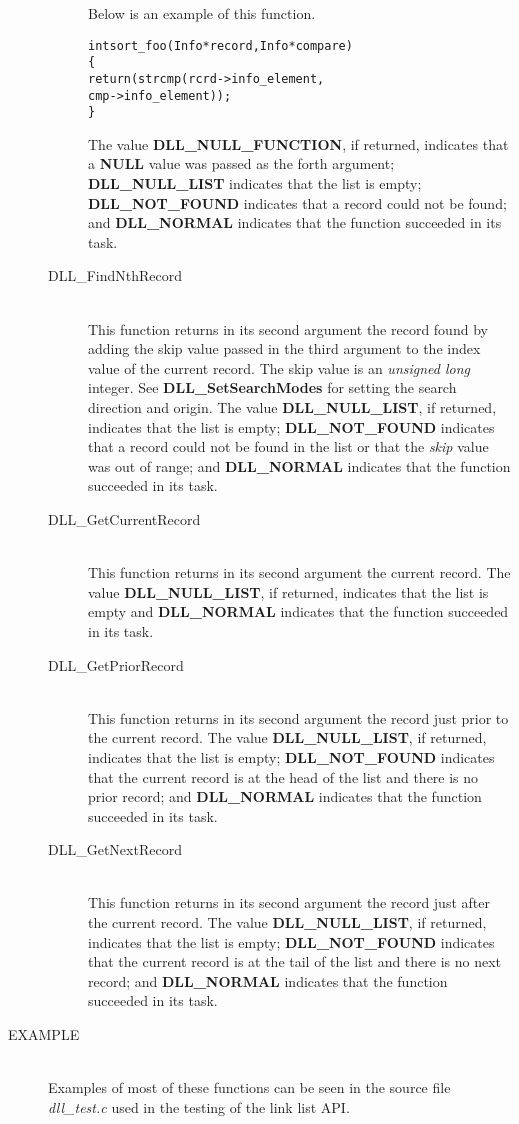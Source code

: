 \documentclass[10pt,letterpaper,titlepage]{article}
\begin{document}
\begin{description}
\begin{description}
 Below is an example of this function.

 \begin{alltt}
   int sort_foo(Info *record, Info *compare)
      \{
      return(strcmp(rcrd->info_element,
                    cmp->info_element));
      \}

 \end{alltt}

  The value \textbf{DLL\_NULL\_FUNCTION}, if returned, indicates that a \textbf{NULL} value was passed as the forth argument; \textbf{DLL\_NULL\_LIST} indicates that the list is empty; \textbf{DLL\_NOT\_FOUND} indicates that a record could not be found; and \textbf{DLL\_NORMAL} indicates that the function succeeded in its task.

 \item[DLL\_FindNthRecord]\quad\\
 This function returns in its second argument the record found by adding the skip value passed in the third argument to the index value of the current record.  The skip value is an \emph{unsigned long} integer.  See \textbf{DLL\_SetSearchModes} for setting the search direction and origin.  The value \textbf{DLL\_NULL\_LIST}, if returned, indicates that the list is empty; \textbf{DLL\_NOT\_FOUND} indicates that a record could not be found in the list or that the \emph{skip} value was out of range; and \textbf{DLL\_NORMAL} indicates that the function succeeded in its task.

 \item[DLL\_GetCurrentRecord]\quad\\
 This function returns in its second argument the current record.  The value \textbf{DLL\_NULL\_LIST}, if returned, indicates that the list is empty and \textbf{DLL\_NORMAL} indicates that the function succeeded in its task.

 \item[DLL\_GetPriorRecord]\quad\\
 This function returns in its second argument the record just prior to the current record.  The value \textbf{DLL\_NULL\_LIST}, if returned, indicates that the list is empty; \textbf{DLL\_NOT\_FOUND} indicates that the current record is at the head of the list and there is no prior record; and \textbf{DLL\_NORMAL} indicates that the function succeeded in its task.

 \item[DLL\_GetNextRecord]\quad\\
 This function returns in its second argument the record just after the current record.  The value \textbf{DLL\_NULL\_LIST}, if returned, indicates that the list is empty; \textbf{DLL\_NOT\_FOUND} indicates that the current record is at the tail of the list and there is no next record; and \textbf{DLL\_NORMAL} indicates that the function succeeded in its task.
 \end{description}

\item[EXAMPLE]\quad\\
Examples of most of these functions can be seen in the source file \emph{dll\_test.c} used in the testing of the link list API.

\end{description}
\end{document}
